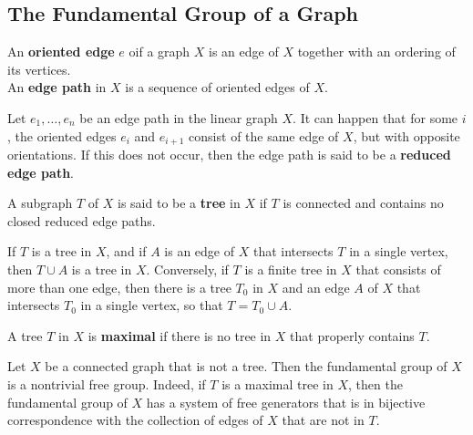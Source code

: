 \subsection{The Fundamental Group of a Graph}

\begin{definition}
An \textbf{oriented edge} $e$ oif a graph $X$ is an edge of $X$ together with an ordering of its vertices. \\

An \textbf{edge path} in $X$ is a sequence of oriented edges of $X$.
\end{definition}

\begin{definition}
Let $e_1, \dots, e_n$ be an edge path in the linear graph $X$. It can happen that for some $i$, the oriented edges
$e_i$ and $e_{i+1}$ consist of the same edge of $X$, but with opposite orientations. If this does not occur,
then the edge path is said to be a \textbf{reduced edge path}.
\end{definition}

\begin{definition}
A subgraph $T$ of $X$ is said to be a \textbf{tree} in $X$ if $T$ is connected and contains no closed reduced edge paths.
\end{definition}

\begin{lemma*}[84.2]
If $T$ is a tree in $X$, and if $A$ is an edge of $X$ that intersects $T$ in a single vertex, then 
$T \cup A$ is a tree in $X$. Conversely, if $T$ is a finite tree in $X$ that consists of more than one edge, then there is 
a tree $T_0$ in $X$ and an edge $A$ of $X$ that intersects $T_0$ in a single vertex, so that $T = T_0 \cup A$. 
\end{lemma*}

\begin{definition}
A tree $T$ in $X$ is \textbf{maximal} if there is no tree in $X$ that properly contains $T$.
\end{definition}

\begin{theorem*}[84.7]
Let $X$ be a connected graph that is not a tree. Then the fundamental group of $X$ is a nontrivial free group.
Indeed, if $T$ is a maximal tree in $X$, then the fundamental group of $X$ has a system of free generators that is in
bijective correspondence with the collection of edges of $X$ that are not in $T$.
\end{theorem*}

